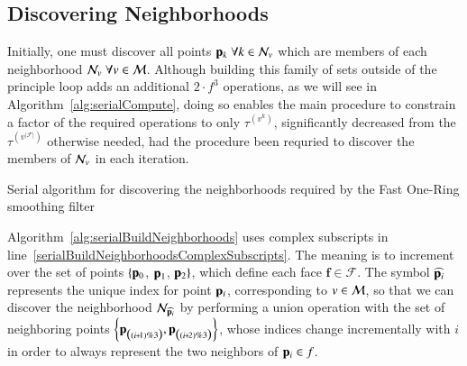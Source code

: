 \subsection{Discovering Neighborhoods}
\label{ch5sSIssDN}
Initially, one must discover all points $\mathbf{p}_k \; \forall k \in \mathcal{N}_v$ which are members of each neighborhood $\mathcal{N}_v \; \forall v \in \mathcal{M}$. Although building this family of sets outside of the principle loop adds an additional $2\cdot f^3$ operations, as we will see in Algorithm~\ref{alg:serialCompute}, doing so enables the main procedure to constrain a factor of the required operations to only $\tau^{(v^k)}$, significantly decreased from the $\tau^{(v^{|\mathcal{F}|})}$ otherwise needed, had the procedure been requried to discover the members of $\mathcal{N}_v$ in each iteration.
%
\begin{algorithm}
	\DontPrintSemicolon


	\bigskip
	\;
\nl	{}
	\caption{Serial algorithm for discovering the neighborhoods required by the Fast One-Ring smoothing filter\label{alg:serialBuildNeighborhoods}}
\end{algorithm}%
%

Algorithm~\ref{alg:serialBuildNeighborhoods} uses complex subscripts in line~\ref{serialBuildNeighborhoodsComplexSubscripts}. The meaning is to increment over the set of points $\{\mathbf{p}_0$, $\mathbf{p}_1$, $\mathbf{p}_2\}$, which define each face $\mathbf{f} \in \mathcal{F}$. The symbol $\widehat{\mathbf{p}_i}$ represents the unique index for point $\mathbf{p}_i$, corresponding to $v \in \mathcal{M}$, so that we can discover the neighborhood $\mathcal{N}_{\widehat{\mathbf{p}_i}}$ by performing a union operation with the set of neighboring points $\left \{\bp_{\big((\sipo)\%3\big)}, \bp_{\big((\sipt)\%3\big)}\right \}$, whose indices change incrementally with $i$ in order to always represent the two neighbors of $\mathbf{p}_i \in f$.
%
%
%
